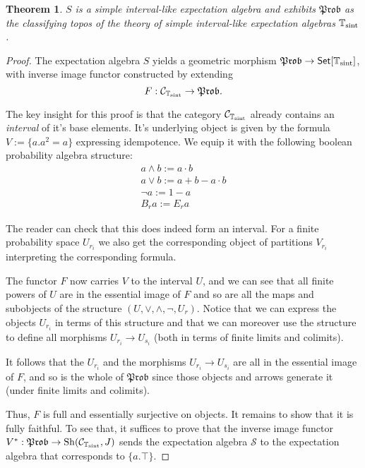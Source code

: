 \documentclass[a4paper]{amsproc}
\theoremstyle{plain}
\newtheorem{theorem}{Theorem}[section]
\theoremstyle{definition}
\theoremstyle{remark}
\numberwithin{equation}{section}
\DeclareMathOperator{\Sh}{Sh}
\newcommand{\Set}{\textup{\textsf{Set}}}
\newcommand{\Prob}{\mathfrak{Prob}}
\begin{document}
\begin{theorem}\label{classifying_sint}
    $S$ is a simple interval-like expectation algebra and exhibits $\Prob$ as the classifying topos of the theory of simple interval-like expectation algebras $\mathbb{T}_{\textup{sint}}$.
\end{theorem}
\begin{proof}
    The expectation algebra $S$ yields a geometric morphism $\Prob \to \Set[\mathbb{T}_{\textup{sint}}]$, with inverse image functor constructed by extending
    \[
        F: \mathcal{C}_{\mathbb{T}_{\textup{sint}}} \to \Prob .
    \]

    The key insight for this proof is that the category $\mathcal{C}_{\mathbb{T}_{\textup{sint}}}$ already contains an \emph{interval} of it's base elements. It's underlying object is given by the formula $V := \{ a . a^2 = a\}$ expressing idempotence. We equip it with the following boolean probability algebra structure:
    \begin{align*}
        a \wedge b := a \cdot b \\
        a \vee b := a + b - a \cdot b \\
        \neg a := 1 - a \\
        B_r a := E_r a
    \end{align*}

    The reader can check that this does indeed form an interval. For a finite probability space $U_{r_i}$ we also get the corresponding object of partitions $V_{r_i}$ interpreting the corresponding formula.

    The functor $F$ now carries $V$ to the interval $U$, and we can see that all finite powers of $U$ are in the essential image of $F$ and so are all the maps and subobjects of the structure $(U,\vee,\wedge,\neg,U_r)$. Notice that we can express the objects $U_{r_i}$ in terms of this structure and that we can moreover use the structure to define all morphisms $U_{r_i} \to U_{s_i}$ (both in terms of finite limits and colimits).
    
    It follows that the $U_{r_i}$ and the morphisms $U_{r_i} \to U_{s_i}$ are all in the essential image of $F$, and so is the whole of $\Prob$ since those objects and arrows generate it (under finite limits and colimits).

    Thus, $F$ is full and essentially surjective on objects. It remains to show that it is fully faithful. To see that, it suffices to prove that the inverse image functor $V^*: \Prob \to \Sh(\mathcal{C}_{\mathbb{T}_{\textup{sint}}}, J)$ sends the expectation algebra $\mathcal{S}$ to the expectation algebra that corresponds to $\{ a . \top \}$.


\end{proof}
\end{document}
